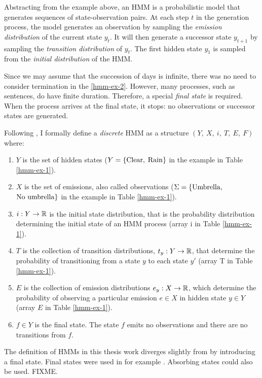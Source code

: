 Abstracting from the example above, an HMM is a probabilistic model
that generates sequences of state-observation pairs. At each step $t$
in the generation process, the model generates an observation by
sampling the {\it emission distribution} of the current state
$y_t$. It will then generate a successor state $y_{t+1}$ by sampling
the {\it transition distribution} of $y_t$. The first hidden state $y_1$
is sampled from the {\it initial distribution} of the HMM.

Since we may assume that the succession of days is infinite, there was
no need to consider termination in the \ref{hmm-ex-2}. However, many
processes, such as sentences, do have finite duration. Therefore, a
special {\it final state} is required. When the process arrives at the
final state, it stops: no observations or successor states are generated.

Following \cite{Rabiner1989}, I formally define a {\it discrete} HMM
as a structure $(Y,\ X,\ i,\ T,\ E,\ F)$ where:
\begin{enumerate}
\item $Y$ is the set of hidden states ($Y = \{{\rm Clear},$ ${\rm Rain}\}$
  in the example in Table \ref{hmm-ex-1}).
\item $X$ is the set of emissions, also called observations ($\Sigma =
  \{{\rm Umbrella},$ ${\rm No\ umbrella}\}$ in the example in Table
  \ref{hmm-ex-1}).
\item $i: Y \rightarrow \mbox{$\mathbb R$}$ is the initial state distribution, that is the probability
  distribution determining the initial state of an HMM process (array
  i in Table \ref{hmm-ex-1}).
\item $T$ is the collection of transition distributions, $t_y: Y \rightarrow \mbox{$\mathbb R$}$, that
  determine the probability of transitioning from a state $y$ to each state
  $y'$ (array T in Table \ref{hmm-ex-1}).
\item $E$ is the collection of emission distributions $e_y: X
  \rightarrow \mbox{$\mathbb R$}$, which determine the probability of observing a
  particular emission $e \in X$ in hidden state $y \in Y$ (array $E$
  in Table \ref{hmm-ex-1}).
\item $f \in Y$ is the final state. The state $f$ emits no
  observations and there are no transitions from $f$.
\end{enumerate}
The definition of HMMs in this thesis work diverges slightly from
\cite{Rabiner1989} by introducing a final state. Final states were
used in for example \cite{foo}. Absorbing states \cite{bar} could also
be used. FIXME.

